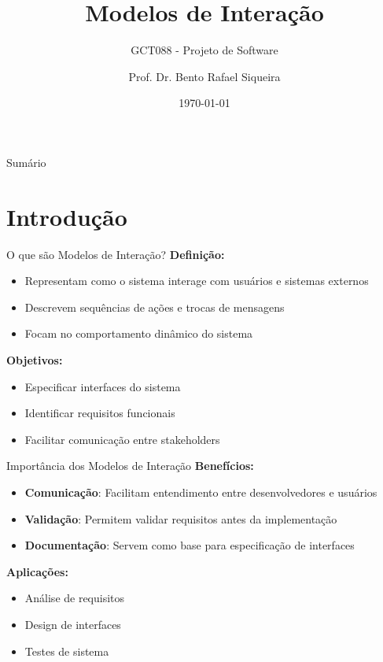 \documentclass[aspectratio=169]{beamer}
\title[Modelos de Interação]{Modelos de Interação}
\subtitle{GCT088 - Projeto de Software}
\author{Prof. Dr. Bento Rafael Siqueira}
\institute{Universidade Federal de Lavras\\Departamento de Ciência da Computação}
\date{\today}
\begin{document}
\begin{frame}
\titlepage
\end{frame}

\begin{frame}{Sumário}
\tableofcontents
\end{frame}

\section{Introdução}

\begin{frame}{O que são Modelos de Interação?}
\textbf{Definição:}
\begin{itemize}
\item Representam como o sistema interage com usuários e sistemas externos
\item Descrevem sequências de ações e trocas de mensagens
\item Focam no comportamento dinâmico do sistema
\end{itemize}

\vspace{0.5cm}
\textbf{Objetivos:}
\begin{itemize}
\item Especificar interfaces do sistema
\item Identificar requisitos funcionais
\item Facilitar comunicação entre stakeholders
\end{itemize}
\end{frame}

\begin{frame}{Importância dos Modelos de Interação}
\textbf{Benefícios:}
\begin{itemize}
\item \textbf{Comunicação}: Facilitam entendimento entre desenvolvedores e usuários
\item \textbf{Validação}: Permitem validar requisitos antes da implementação
\item \textbf{Documentação}: Servem como base para especificação de interfaces
\end{itemize}

\vspace{0.5cm}
\textbf{Aplicações:}
\begin{itemize}
\item Análise de requisitos
\item Design de interfaces
\item Testes de sistema
\end{itemize}
\end{frame}
\end{document}

